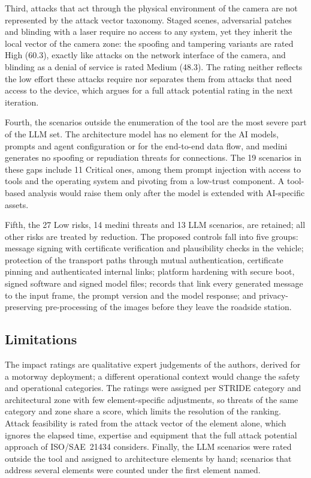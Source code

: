 Third, attacks that act through the physical environment of the camera are
not represented by the attack vector taxonomy. Staged scenes, adversarial
patches and blinding with a laser require no access to any system, yet they
inherit the local vector of the camera zone: the spoofing and tampering
variants are rated High (60.3), exactly like attacks on the network interface
of the camera, and blinding as a denial of service is rated Medium (48.3). The
rating neither reflects the low effort these attacks require nor separates them
from attacks that need access to the device, which argues for a full attack
potential rating in the next iteration.

Fourth, the scenarios outside the enumeration of the tool are the most severe
part of the LLM set. The architecture model has no element for the AI models,
prompts and agent configuration or for the end-to-end data flow, and medini
generates no spoofing or repudiation threats for connections. The 19 scenarios
in these gaps include 11 Critical ones, among them prompt injection with access
to tools and the operating system and pivoting from a low-trust component. A
tool-based analysis would raise them only after the model is extended with
AI-specific assets.

Fifth, the 27 Low risks, 14 medini threats and 13 LLM scenarios, are retained;
all other risks are treated by reduction.
The proposed controls fall into five groups: message signing with certificate
verification and plausibility checks in the vehicle; protection of the
transport paths through mutual authentication, certificate pinning and
authenticated internal links; platform hardening with secure boot, signed
software and signed model files; records that link every generated message to
the input frame, the prompt version and the model response; and
privacy-preserving pre-processing of the images before they leave the roadside
station.

\subsection{Limitations}

The impact ratings are qualitative expert judgements of the authors, derived
for a motorway deployment; a different operational context would change the
safety and operational categories. The ratings were assigned per STRIDE
category and architectural zone with few element-specific adjustments, so
threats of the same category and zone share a score, which limits the
resolution of the ranking. Attack feasibility is rated from the attack vector
of the element alone, which ignores the elapsed time, expertise and equipment
that the full attack potential approach of ISO/SAE~21434 considers. Finally,
the LLM scenarios were rated outside the tool and assigned to architecture
elements by hand; scenarios that address several elements were counted under
the first element named.

